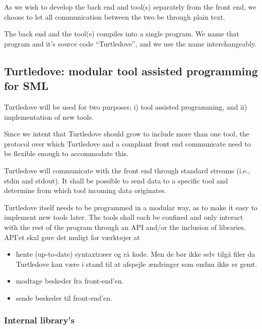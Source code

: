 \documentclass[a4paper,oneside]{memoir}
\begin{document}
As we wish to develop the back end and tool(s) separately from the front end, we choose to let all
communication between the two be through plain text.

The back end and the tool(s) compiles into a single program. We name that program and it's source
code ``Turtledove'', and we use the name interchangeably.

\subsection{Turtledove: modular tool assisted programming for SML} 
Turtledove will be used for two purposes; i) tool assisted programming, and ii) implementation of
new tools.

Since we intent that Turtledove should grow to include more than one tool, the
protocol over which Turtledove and a compliant front end communicate need to be
flexible enough to accommodate this.  


Turtledove will communicate with the front end through standard streams (i.e., stdin and stdout). It
shall be possible to send data to a specific tool and determine from which tool
incoming data originates.
\\


Turtledove itself needs to be programmed in a modular way, as to make it easy to implement new tools
later. The tools shall each be confined and only interact with the rest of the program through an
API and/or the inclusion of libraries.
\\


API'et skal gøre det muligt for værktøjer at
\begin{itemize}
\item hente (up-to-date) syntaxtræer og rå kode. Men de bør ikke selv tilgå filer da Turtledove kan
      være i stand til at afspejle ændringer som endnu ikke er gemt.
\item modtage beskeder fra front-end'en.
\item sende beskeder til front-end'en.
\end{itemize}


\subsubsection{Internal library's}
\end{document}
